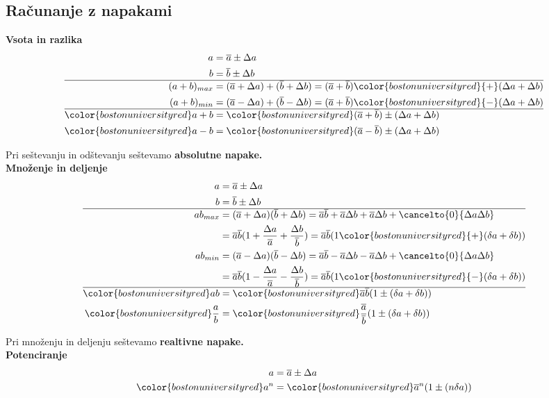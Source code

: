 {\color{indiagreen}\subsection{Računanje z napakami}}
\textbf{Vsota in razlika}
\begin{align*}
	a &= \overline{a} \pm \Delta a\\
	b &= \overline{b} \pm \Delta b\\
	\hline
	(a+b)_{max} &= (\overline{a} + \Delta a) + (\overline{b} + \Delta b) = (\overline{a} + \overline{b}) {\color{bostonuniversityred}{+}} (\Delta{a} + \Delta{b})\\
	(a+b)_{min} &= (\overline{a} - \Delta a) + (\overline{b} - \Delta b) = (\overline{a} + \overline{b}) {\color{bostonuniversityred}{-}} (\Delta{a} + \Delta{b})\\
	\hline
	\color{bostonuniversityred} a + b &= \color{bostonuniversityred} (\overline{a} + \overline{b}) \pm (\Delta{a} + \Delta{b})\\
	\color{bostonuniversityred} a - b &= \color{bostonuniversityred} (\overline{a} - \overline{b}) \pm (\Delta{a} + \Delta{b})\\
\end{align*}

Pri seštevanju in odštevanju seštevamo \textbf{absolutne napake.}
\\
\textbf{Množenje in deljenje}
\begin{align*}
	a &= \overline{a} \pm \Delta a\\
	b &= \overline{b} \pm \Delta b\\
	\hline
	ab_{max} &= (\overline{a} + \Delta a)(\overline{b} + \Delta b) = \overline{a}\overline{b} + \overline{a}\Delta b + \overline{a}\Delta b + {\cancelto{0}{\Delta a \Delta b}}\\
	&= \overline{a}\overline{b}(1 + \frac{\Delta a}{\overline{a}} + \frac{\Delta b}{\overline{b}}) = \overline{a}\overline{b}(1 {\color{bostonuniversityred}{+}} (\delta a + \delta b))\\
	ab_{min} &= (\overline{a} - \Delta a)(\overline{b} - \Delta b) = \overline{a}\overline{b} - \overline{a}\Delta b - \overline{a}\Delta b + {\cancelto{0}{\Delta a \Delta b}}\\
	&= \overline{a}\overline{b}(1 - \frac{\Delta a}{\overline{a}} - \frac{\Delta b}{\overline{b}}) = \overline{a}\overline{b}(1 {\color{bostonuniversityred}{-}} (\delta a + \delta b))\\
	\hline
	\color{bostonuniversityred} ab &= \color{bostonuniversityred} \overline{a}\overline{b}(1 \pm (\delta{a} + \delta{b}))\\
	\color{bostonuniversityred} \frac{a}{b} &= \color{bostonuniversityred} \frac{\overline{a}}{\overline{b}}(1 \pm (\delta{a} + \delta{b}))\\
\end{align*}

Pri množenju in deljenju seštevamo \textbf{realtivne napake.}
\\
\textbf{Potenciranje}
\begin{align*}
	a &= \overline{a} \pm \Delta a\\
	\color{bostonuniversityred} a^n &= \color{bostonuniversityred} \overline{a}^n (1 \pm (n\delta{a}))\\
\end{align*}